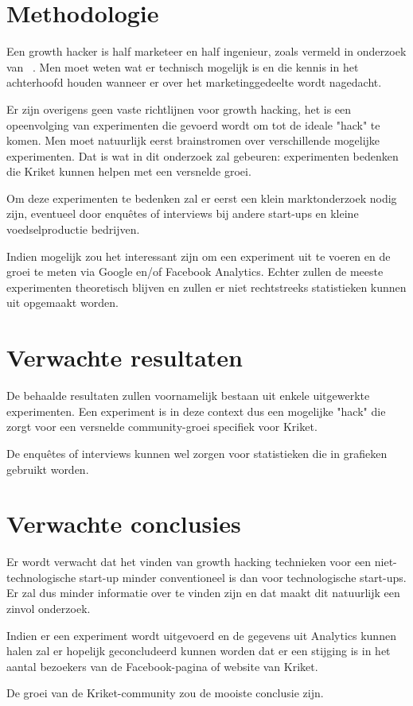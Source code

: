 \section{Methodologie}
\label{sec:methodologie}

Een growth hacker is half marketeer en half ingenieur, zoals vermeld in onderzoek van ~\cite{Lee2016}. Men moet weten wat er technisch mogelijk is en die kennis in het achterhoofd houden wanneer er over het marketinggedeelte wordt nagedacht. 

Er zijn overigens geen vaste richtlijnen voor growth hacking, het is een opeenvolging van experimenten die gevoerd wordt om tot de ideale "hack" te komen. Men moet natuurlijk eerst brainstromen over verschillende mogelijke experimenten. Dat is wat in dit onderzoek zal gebeuren: experimenten bedenken die Kriket kunnen helpen met een versnelde groei.

Om deze experimenten te bedenken zal er eerst een klein marktonderzoek nodig zijn, eventueel door enquêtes of interviews bij andere start-ups en kleine voedselproductie bedrijven. 

Indien mogelijk zou het interessant zijn om een experiment uit te voeren en de groei te meten via Google en/of Facebook Analytics. Echter zullen de meeste experimenten theoretisch blijven en zullen er niet rechtstreeks statistieken kunnen uit opgemaakt worden.

\section{Verwachte resultaten}
\label{sec:verwachte_resultaten}

De behaalde resultaten zullen voornamelijk bestaan uit enkele uitgewerkte experimenten. Een experiment is in deze context dus een mogelijke "hack" die zorgt voor een versnelde community-groei specifiek voor Kriket. 


De enquêtes of interviews kunnen wel zorgen voor statistieken die in grafieken gebruikt worden.

\section{Verwachte conclusies}
\label{sec:verwachte_conclusies}

Er wordt verwacht dat het vinden van growth hacking technieken voor een niet-technologische start-up minder conventioneel is dan voor technologische start-ups. Er zal dus minder informatie over te vinden zijn en dat maakt dit natuurlijk een zinvol onderzoek.

Indien er een experiment wordt uitgevoerd en de gegevens uit Analytics kunnen halen zal er hopelijk geconcludeerd kunnen worden dat er een stijging is in het aantal bezoekers van de Facebook-pagina of website van Kriket.

De groei van de Kriket-community zou de mooiste conclusie zijn.

